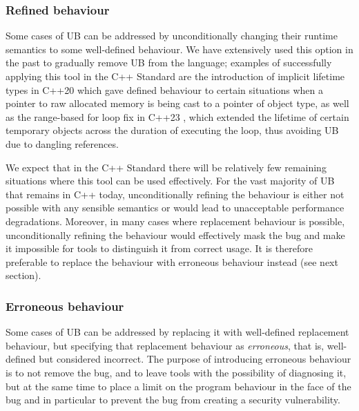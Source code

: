 \subsubsection{Refined behaviour}
\label{refined}

Some cases of UB can be addressed by unconditionally changing their runtime semantics to some well-defined behaviour. We have extensively used this option in the past to gradually remove UB from the language; examples of successfully applying this tool in the C++ Standard are the introduction of implicit lifetime types in C++20 \cite{P0593R6} which gave defined behaviour to certain situations when a pointer to raw allocated memory is being cast to a pointer of object type, as well as the range-based for loop fix in C++23 \cite{P2644R1},  which extended the lifetime of certain temporary objects across the duration of executing the loop, thus avoiding UB due to dangling references. 

We expect that in the C++ Standard there will be relatively few remaining situations where this tool can be used effectively. For the vast majority of UB that remains in C++ today, unconditionally refining the behaviour is either not possible with any sensible semantics or would lead to unacceptable performance degradations. Moreover, in many cases where replacement behaviour is possible, unconditionally refining the behaviour would effectively mask the bug and make it impossible for tools to distinguish it from correct usage. It is therefore preferable to replace the behaviour with erroneous behaviour instead (see next section). 

\subsubsection{Erroneous behaviour}
\label{erroneous}

Some cases of UB can be addressed by replacing it with well-defined replacement behaviour, but specifying that replacement behaviour as \emph{erroneous}, that is, well-defined but considered incorrect. The purpose of introducing erroneous behaviour is to not remove the bug, and to leave tools with the possibility of diagnosing it, but at the same time to place a limit on the program behaviour in the face of the bug and in particular to prevent the bug from creating a security vulnerability.

